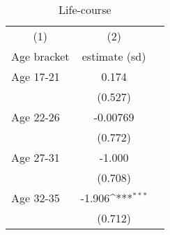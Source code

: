 \documentclass[11pt, a4paper]{article} %
\begin{document}
\begin{table}[H]\centering
\caption{Life-course}
 {\def\sym#1{\ifmmode^{#1}\else\(^{#1}\)\fi} 
	\begin{tabular}{lcc}
	\toprule
	\multicolumn{1}{c}{(1)}&\multicolumn{1}{c}{(2)} \\
	Age bracket & estimate (sd) \\
	\midrule
	Age 17-21 & 0.174  \\ 
	& (0.527) \\
	Age 22-26 & -0.00769  \\ 
	& (0.772) \\
	Age 27-31 & -1.000  \\ 
	& (0.708) \\ 
	Age 32-35 &	-1.906\sym{***} \\
	 & (0.712) \\
	 \bottomrule
	\end{tabular}} 
\end{table} 






\end{document}
